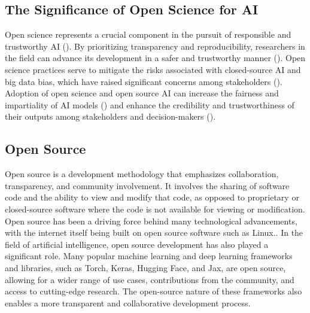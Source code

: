 \subsection{The Significance of Open Science for AI}

 
Open science represents a crucial component in the pursuit of responsible and trustworthy AI (\cite{floridi2019establishing,coro2020open,braun2018open,hicks2021open}). By prioritizing transparency and reproducibility, researchers in the field can advance its development in a safer and trustworthy manner (\cite{coro2020open,floridi2018ai4people,kocak2022transparency,stodden-towardreprodicibleresearch}).
Open science practices serve to mitigate the risks associated with closed-source AI and big data bias, which have raised significant concerns among stakeholders (\cite{batarseh2020data, o2017weapons}). Adoption of open science and open source AI can increase the fairness and impartiality of AI models (\cite{stodden-towardreprodicibleresearch,accountabilityInAi,gundersen2018reproducible}) and enhance the credibility and trustworthiness of their outputs among stakeholders and decision-makers (\cite{goodman2017european,hsiao2018vtaiwan,praprotnikevaluation}). %

\subsection{Open Source}
Open source is a development methodology that emphasizes collaboration, transparency, and community involvement. It involves the sharing of software code and the ability to view and modify that code, as opposed to proprietary or closed-source software where the code is not available for viewing or modification. Open source has been a driving force behind many technological advancements, with the internet itself being built on open source software such as Linux..
In the field of artificial intelligence, open source development has also played a significant role. Many popular machine learning and deep learning frameworks and libraries, such as Torch, Keras, Hugging Face, and Jax, are open source, allowing for a wider range of use cases, contributions from the community, and access to cutting-edge research. The open-source nature of these frameworks also enables a more transparent and collaborative development process.


